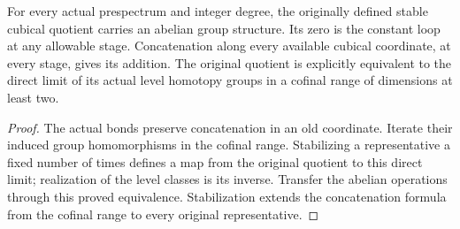 \begin{proposition}
  \leanok
  For every actual prespectrum and integer degree, the originally defined stable cubical quotient carries an abelian group structure. Its zero is the constant loop at any allowable stage. Concatenation along every available cubical coordinate, at every stage, gives its addition. The original quotient is explicitly equivalent to the direct limit of its actual level homotopy groups in a cofinal range of dimensions at least two.
\end{proposition}
\begin{proof}
  The actual bonds preserve concatenation in an old coordinate. Iterate their induced group homomorphisms in the cofinal range. Stabilizing a representative a fixed number of times defines a map from the original quotient to this direct limit; realization of the level classes is its inverse. Transfer the abelian operations through this proved equivalence. Stabilization extends the concatenation formula from the cofinal range to every original representative.
  \leanok
\end{proof}


